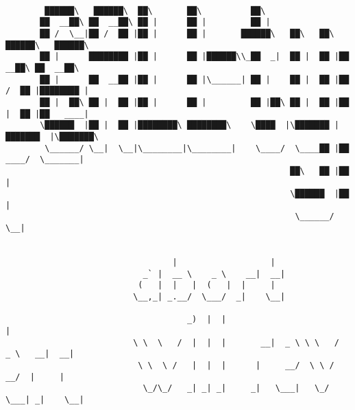 \documentclass[varwidth=\maxdimen,margin=0.5cm,multi={verbatim}]{standalone}
\begin{document}
\begin{verbatim}

        ██████\   ██████\  ██\       ██\          ██\
       ██  __██\ ██  __██\ ██ |      ██ |         ██ |
       ██ /  \__|██ /  ██ |██ |      ██ |       ██████\   ██\   ██\  ██████\   ██████\
       ██ |      ████████ |██ |      ██ |██████\\_██  _|  ██ |  ██ |██  __██\ ██  __██\
       ██ |      ██  __██ |██ |      ██ |\______| ██ |    ██ |  ██ |██ /  ██ |████████ |
       ██ |  ██\ ██ |  ██ |██ |      ██ |         ██ |██\ ██ |  ██ |██ |  ██ |██   ____|
       \██████  |██ |  ██ |████████\ ████████\    \████  |\███████ |███████  |\███████\
        \______/ \__|  \__|\________|\________|    \____/  \____██ |██  ____/  \_______|
                                                          ██\   ██ |██ |
                                                          \██████  |██ |
                                                           \______/ \__|


                                  |                   |
                            _` |  __ \    _ \    __|  __|
                           (   |  |   |  (   |  |     |
                          \__,_| _.__/  \___/  _|    \__|

                                     _)  |  |                                    |
                          \ \  \   /  |  |  |       __|  _ \ \ \   /  _ \   __|  __|
                           \ \  \ /   |  |  |      |     __/  \ \ /   __/  |     |
                            \_/\_/   _| _| _|     _|   \___|   \_/  \___| _|    \__|



\end{verbatim}
\end{document}
